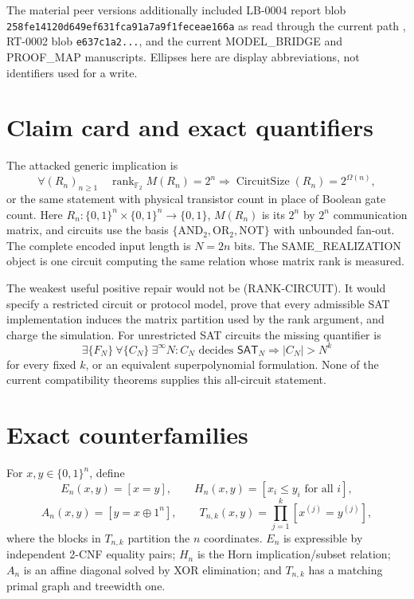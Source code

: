 \documentclass[11pt]{article}
\newcommand{\SAT}{\mathsf{SAT}}
\newcommand{\Ftwo}{\mathbb F_2}
\begin{document}
The material peer versions additionally included LB-0004 report blob
\texttt{258fe14120d649ef631fca91a7a9f1feceae166a} as read through the current path
,
RT-0002 blob \texttt{e637c1a2...}, and the current MODEL\_BRIDGE and
PROOF\_MAP manuscripts.  Ellipses here are display abbreviations, not
identifiers used for a write.

\section{Claim card and exact quantifiers}
The attacked generic implication is
\[
 \forall (R_n)_{n\ge1}\quad
 \operatorname{rank}_{\Ftwo}M(R_n)=2^n
 \Longrightarrow
 \operatorname{CircuitSize}(R_n)=2^{\Omega(n)},             \tag{RANK-CIRCUIT}
\]
or the same statement with physical transistor count in place of Boolean
gate count.  Here $R_n:\{0,1\}^n\times\{0,1\}^n\to\{0,1\}$, $M(R_n)$ is
its $2^n$ by $2^n$ communication matrix, and circuits use the basis
$\{\mathrm{AND}_2,\mathrm{OR}_2,\mathrm{NOT}\}$ with unbounded fan-out.
The complete encoded input length is $N=2n$ bits.  The SAME\_REALIZATION
object is one circuit computing the same relation whose matrix rank is
measured.

The weakest useful positive repair would not be (RANK-CIRCUIT).  It would
specify a restricted circuit or protocol model, prove that every admissible
SAT implementation induces the matrix partition used by the rank argument,
and charge the simulation.  For unrestricted SAT circuits the missing
quantifier is
\[
 \exists \{F_N\}\ \forall \{C_N\}\ \exists^\infty N:
 C_N\text{ decides }\SAT_N\Longrightarrow |C_N|>N^k
\]
for every fixed $k$, or an equivalent superpolynomial formulation.  None of
the current compatibility theorems supplies this all-circuit statement.

\section{Exact counterfamilies}
For $x,y\in\{0,1\}^n$, define
\[
 E_n(x,y)=[x=y],\qquad
 H_n(x,y)=[x_i\le y_i\text{ for all }i],
\]
\[
 A_n(x,y)=[y=x\oplus 1^n],\qquad
 T_{n,k}(x,y)=\prod_{j=1}^{k}[x^{(j)}=y^{(j)}],
\]
where the blocks in $T_{n,k}$ partition the $n$ coordinates.
$E_n$ is expressible by independent 2-CNF equality pairs; $H_n$ is the
Horn implication/subset relation; $A_n$ is an affine diagonal solved by
XOR elimination; and $T_{n,k}$ has a matching primal graph and treewidth
one.
\end{document}
